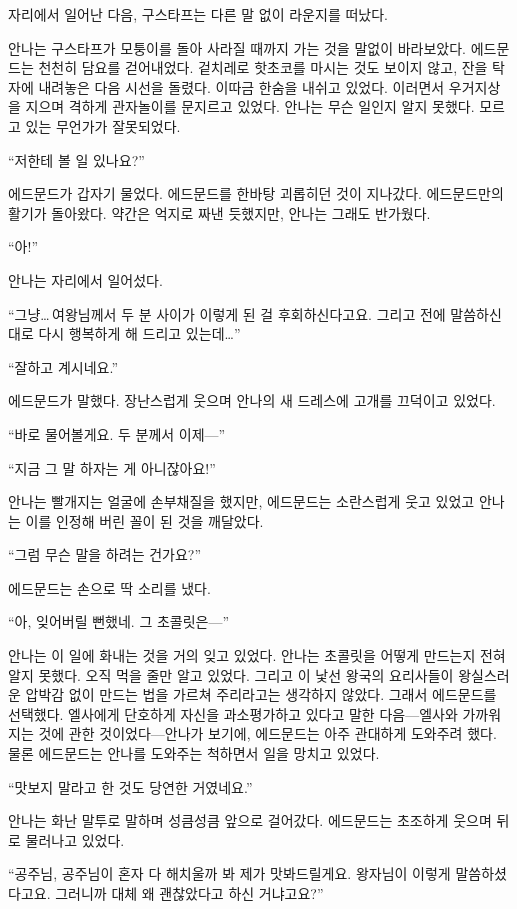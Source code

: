 자리에서 일어난 다음, 구스타프는 다른 말 없이 라운지를 떠났다.

안나는 구스타프가 모퉁이를 돌아 사라질 때까지 가는 것을 말없이 바라보았다. 에드문드는 천천히 담요를 걷어내었다. 겉치레로 핫초코를 마시는 것도 보이지 않고, 잔을 탁자에 내려놓은 다음 시선을 돌렸다. 이따금 한숨을 내쉬고 있었다. 이러면서 우거지상을 지으며 격하게 관자놀이를 문지르고 있었다. 안나는 무슨 일인지 알지 못했다. 모르고 있는 무언가가 잘못되었다.

``저한테 볼 일 있나요?''

에드문드가 갑자기 물었다. 에드문드를 한바탕 괴롭히던 것이 지나갔다. 에드문드만의 활기가 돌아왔다. 약간은 억지로 짜낸 듯했지만, 안나는 그래도 반가웠다.

``아!''

안나는 자리에서 일어섰다.

``그냥\ldots\,여왕님께서 두 분 사이가 이렇게 된 걸 후회하신다고요. 그리고 전에 말씀하신 대로 다시 행복하게 해 드리고 있는데\ldots''

``잘하고 계시네요.''

에드문드가 말했다. 장난스럽게 웃으며 안나의 새 드레스에 고개를 끄덕이고 있었다.

``바로 물어볼게요. 두 분께서 이제—''

``지금 그 말 하자는 게 아니잖아요!''

안나는 빨개지는 얼굴에 손부채질을 했지만, 에드문드는 소란스럽게 웃고 있었고 안나는 이를 인정해 버린 꼴이 된 것을 깨달았다.

``그럼 무슨 말을 하려는 건가요?''

에드문드는 손으로 딱 소리를 냈다.

``아, 잊어버릴 뻔했네. 그 초콜릿은—''

안나는 이 일에 화내는 것을 거의 잊고 있었다. 안나는 초콜릿을 어떻게 만드는지 전혀 알지 못했다. 오직 먹을 줄만 알고 있었다. 그리고 이 낯선 왕국의 요리사들이 왕실스러운 압박감 없이 만드는 법을 가르쳐 주리라고는 생각하지 않았다. 그래서 에드문드를 선택했다. 엘사에게 단호하게 자신을 과소평가하고 있다고 말한 다음—엘사와 가까워지는 것에 관한 것이었다—안나가 보기에, 에드문드는 아주 관대하게 도와주려 했다. 물론 에드문드는 안나를 도와주는 척하면서 일을 망치고 있었다.

``맛보지 말라고 한 것도 당연한 거였네요.''

안나는 화난 말투로 말하며 성큼성큼 앞으로 걸어갔다. 에드문드는 초조하게 웃으며 뒤로 물러나고 있었다.

``공주님, 공주님이 혼자 다 해치울까 봐 제가 맛봐드릴게요. 왕자님이 이렇게 말씀하셨다고요. 그러니까 대체 왜 괜찮았다고 하신 거냐고요?''

